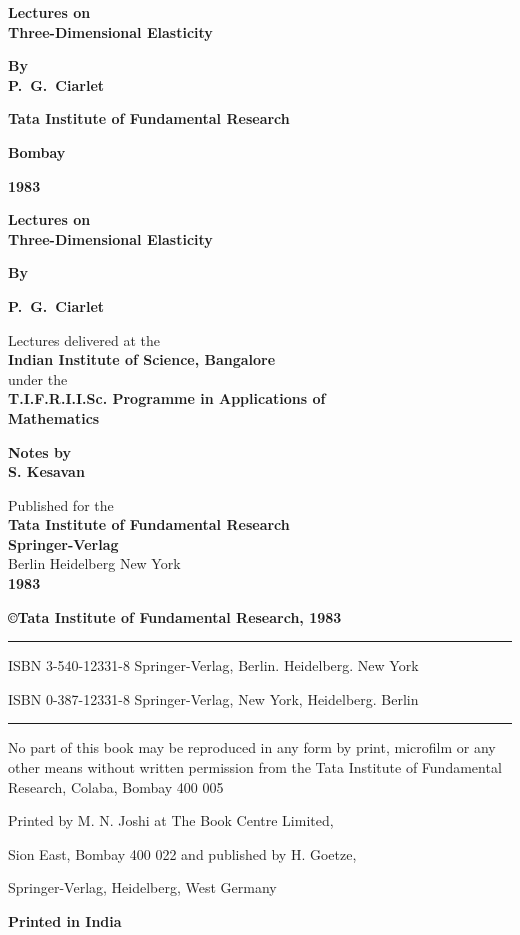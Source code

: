 \thispagestyle{empty}
\begin{center}
{\Large\bf Lectures on}\\[5pt]
{\Large\bf Three-Dimensional Elasticity}
\vskip 1cm

{\bf By}\\[5pt]
{\large\bf P.~G.~Ciarlet}
\vfill

{\bf Tata Institute of Fundamental Research}

{\bf Bombay}

{\bf 1983}
\end{center}
\eject

\thispagestyle{empty}
\begin{center}
{\Large\bf Lectures on}\\[5pt]
{\Large\bf Three-Dimensional Elasticity}
\vskip 1cm

{\bf By}

{\large\bf P.~G.~Ciarlet}
\vfill

{Lectures delivered at the}\\[4pt]
{\bf Indian Institute of Science, Bangalore}\\[10pt]
{under the}\\[10pt]
{\bf T.I.F.R.I.I.Sc. Programme in Applications of}\\[4pt]
{\bf Mathematics}

\vfill

{\bf Notes by}\\[4pt]
{\large\bf S. Kesavan}
\vfill


{Published for the}\\[4pt]
{\bf Tata Institute of Fundamental Research}\\[5pt]
{\bf Springer-Verlag}\\[5pt]
{Berlin Heidelberg New York}\\[4pt]
{\large\bf 1983}
\end{center}
\eject

\thispagestyle{empty}
\begin{center}
{\large\bf \copyright Tata Institute of Fundamental Research, 1983}
\vfill

\rule{\textwidth}{.5pt}

ISBN 3-540-12331-8 Springer-Verlag, Berlin. Heidelberg. New York

ISBN 0-387-12331-8 Springer-Verlag, New York, Heidelberg. Berlin

\rule{\textwidth}{.5pt}
\vfill

\parbox{0.7\textwidth}{No part of this book may be reproduced in any 
form by print, microfilm or any other means without written permission
from the Tata Institute of Fundamental Research, Colaba, 
Bombay 400 005}
\vfill 

Printed by M. N. Joshi at The Book Centre Limited,

Sion East, Bombay 400 022 and published by H. Goetze,

Springer-Verlag, Heidelberg, West Germany

\vfill


{\bf Printed in India}
\end{center}
\eject

